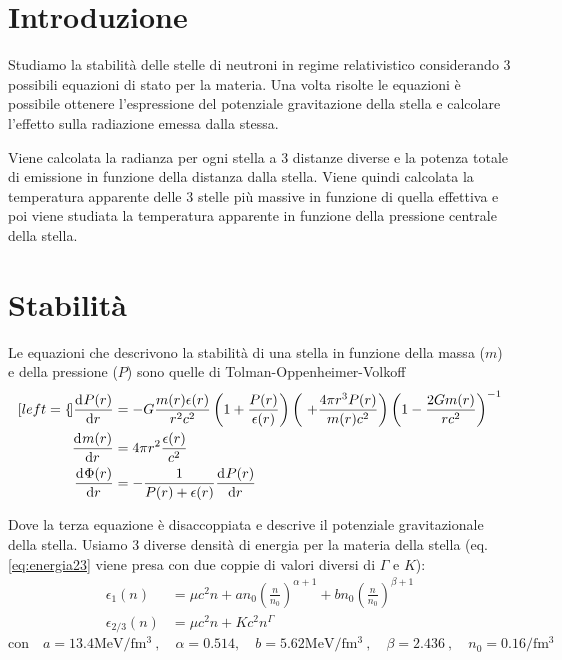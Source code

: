 \documentclass[a4paper, titlepage]{article}
\begin{document}
\tableofcontents
\newpage

\section{Introduzione}
Studiamo la stabilità delle stelle di neutroni in regime relativistico
considerando 3 possibili equazioni di stato per la materia.
Una volta risolte le equazioni è possibile ottenere l'espressione del potenziale
gravitazione della stella e calcolare l'effetto sulla radiazione emessa dalla
stessa.


Viene calcolata la radianza per ogni stella a 3 distanze diverse e la potenza
totale di emissione in funzione della distanza dalla stella.
Viene quindi calcolata la temperatura apparente delle 3 stelle più massive in
funzione di quella effettiva e poi viene studiata la temperatura apparente in 
funzione della pressione centrale della stella.


\section{Stabilità}

Le equazioni che descrivono la stabilità di una stella in funzione della massa
($m$) e della pressione ($P$) sono quelle di Tolman-Oppenheimer-Volkoff
\begin{subequations}
\begin{align}[left = {\empheqlbrace}]
    \dv[]{P(r)}{r} &= - G \frac{m(r) \epsilon (r)}{r^2 c^2}
    \left(1 + \frac{P(r)}{\epsilon (r)} \right)
    \left(\ + \frac{4 \pi r^3 P(r)}{m(r) c^2} \right)
    \left(1 - \frac{2 G m(r)}{r c^2} \right)^{-1} \label{eq:P_corr} \\
    \dv[]{m(r)}{r} &= 4 \pi r^2 \frac{\epsilon (r)}{c^2} \label{eq:m_corr} \\
    \dv[]{\Phi(r)}{r} &= - \frac{1}{P(r) + \epsilon (r)} \dv[]{P(r)}{r}
    \label{eq:Phi_corr}
\end{align}
\label{eq:sistema_corr}
\end{subequations}

Dove la terza equazione è disaccoppiata e descrive il potenziale gravitazionale
della stella.
Usiamo 3 diverse densità di energia per la materia della stella (eq.
\ref{eq:energia23} viene presa con due coppie di valori diversi di $\Gamma$ e
$K$):
\begin{subequations}
\begin{align}
    \epsilon_1 (n) &= \mu c^2 n
    + a n_0 \left( \frac{n}{n_0} \right) ^{\alpha + 1}
    + b n_0 \left( \frac{n}{n_0} \right) ^{\beta + 1} \label{eq:energia1} \\
    \epsilon_{2/3} (n) &= \mu c^2n+Kc^2n^\Gamma \label{eq:energia23}
\end{align}
\end{subequations}
\begin{equation}
    \text{con} \quad a = 13.4 \unit{\mega\electronvolt\per\femto\cubic\meter} \ , \quad
    \alpha = 0.514, \quad
    b = 5.62 \unit{\mega\electronvolt\per\femto\cubic\meter} \ , \quad
    \beta = 2.436 \ , \quad
    n_0 = 0.16 \unit{\per\femto\cubic\meter}
\end{equation}
\end{document}
